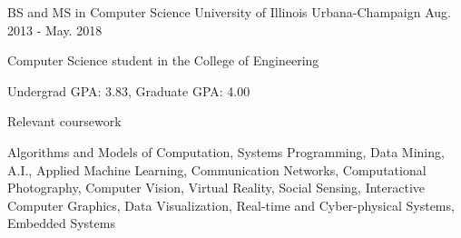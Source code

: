 

\begin{cventries}

  \cventry
    {BS and MS in Computer Science} %
    {University of Illinois} %
    {Urbana-Champaign} %
    {Aug. 2013 - May. 2018} %
    {
      \begin{cvitems} %
        \item {Computer Science student in the College of Engineering}
        \item {Undergrad GPA: 3.83, Graduate GPA: 4.00}
      \end{cvitems}
    }

  \cventry
    {Relevant coursework} %
    {} %
    {} %
    {} %
    {
      \begin{cvitems} %
        \item {Algorithms and Models of Computation, Systems Programming, Data Mining, A.I., Applied Machine Learning, Communication Networks, Computational Photography, Computer Vision, Virtual Reality, Social Sensing, Interactive Computer Graphics, Data Visualization, Real-time and Cyber-physical Systems, Embedded Systems}
      \end{cvitems}
    }

\end{cventries}
